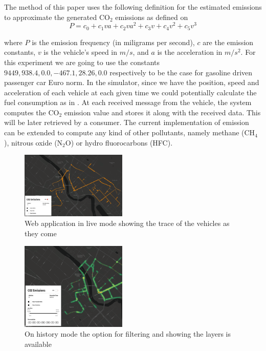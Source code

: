 \documentclass[letter, 10pt, conference]{ieeeconf}
\begin{document}
The method of this paper uses the following definition for the estimated emissions to approximate the generated CO$_2$ emissions as defined on \cite{behrisch_second_2015}
\begin{equation}
  \label{co2_eqn}
  P = c_{0} + c_{1}va + c_{2}va^{2}+c_{3}v+c_{4}v^{2}+c_{5}v^{3}
\end{equation}

where $P$ is the emission frequency (in miligrams per second), $c$ are the emission constants, $v$ is the vehicle's speed in $m/s$, and $a$ is the acceleration in $m/s^{2}$.
For this experiment we are going to use the constants $9449, 938.4, 0.0, -467.1, 28.26, 0.0$ respectively to be the case for gasoline driven passenger car Euro norm.
In the simulator, since we have the position, speed and acceleration of each vehicle at each given time we could potentially calculate the fuel consumption as in \cite{hofer_large_2018}.
At each received message from the vehicle, the system computes the CO$_2$ emission value and stores it along with the received data.
This will be later retrieved by a consumer.
The current implementation of emission can be extended to compute any kind of other pollutants, namely methane (CH$_4$), nitrous oxide (N$_2$O) or hydro fluorocarbons (HFC).

\begin{figure}[h]
  \centering
  \includegraphics[width=0.45\textwidth]{app1}
  \caption{Web application in live mode showing the trace of the vehicles as they come}
  \label{fig:app1}
\end{figure}

\begin{figure}[h]
  \centering
  \includegraphics[width=0.45\textwidth]{app2}
  \caption{On history mode the option for filtering and showing the layers is available}
  \label{fig:app2}
\end{figure}
\end{document}
